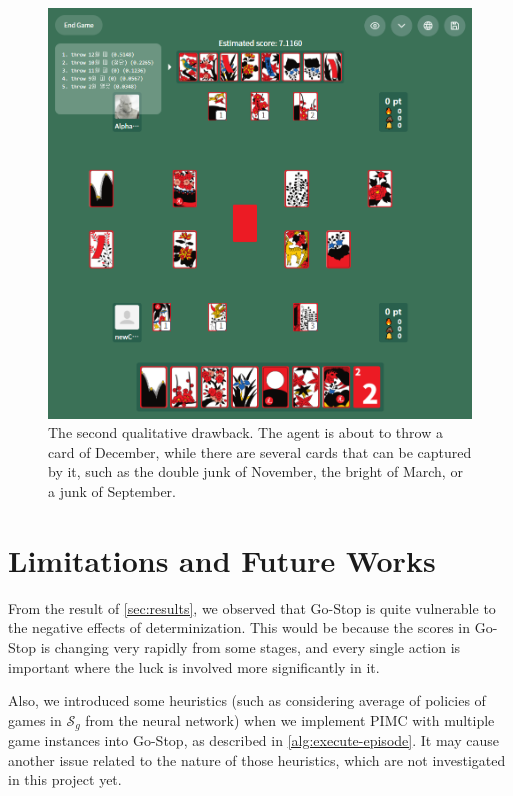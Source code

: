 \documentclass[10pt,twocolumn,letterpaper]{article}
\begin{document}
\begin{figure}[H]
   \centering
   \includegraphics[width=\linewidth]{game-screen-3}
   \caption{The second qualitative drawback. The agent is about to throw a card of December, while there are several cards that can be captured by it, such as the double junk of November, the bright of March, or a junk of September.}
   \label{fig:drawback-2}
\end{figure}


\section{Limitations and Future Works}
\label{sec:limitations}
From the result of \cref{sec:results}, we observed that Go-Stop is quite vulnerable to the negative effects of determinization. This would be because the scores in Go-Stop is changing very rapidly from some stages, and every single action is important where the luck is involved more significantly in it.

Also, we introduced some heuristics (such as considering average of policies of games in $\mathcal S_g$ from the neural network) when we implement PIMC with multiple game instances into Go-Stop, as described in \cref{alg:execute-episode}. It may cause another issue related to the nature of those heuristics, which are not investigated in this project yet.
\end{document}
